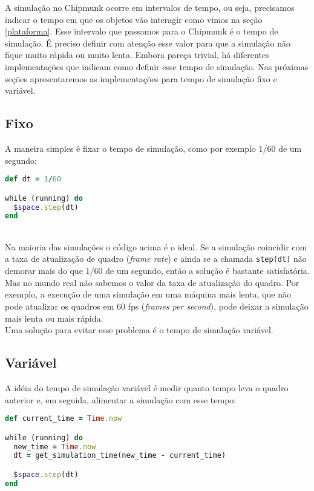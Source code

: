 A simulação no Chipmunk ocorre em intervalos de tempo, ou seja, precisamos indicar o tempo em que os objetos vão interagir como vimos na seção \ref{plataforma}. 
Esse intervalo que passamos para o Chipmunk é o tempo de simulação. É preciso definir com atenção esse valor para que a simulação não fique muito rápida
ou muito lenta. Embora pareça trivial, há diferentes implementações que indicam como definir esse tempo de simulação. Nas 
próximas seções apresentaremos as implementações para tempo de simulação fixo e variável.

\subsection{Fixo}

A maneira simples é fixar o tempo de simulação, como por exemplo 1/60 de um segundo:

\begin{lstlisting}[language=Ruby, caption=Implementação de tempo de simulação fixo]
def dt = 1/60

while (running) do
  $space.step(dt)
end
\end{lstlisting}

\ \\
\hspace*{14pt} Na maioria das simulações o código acima é o ideal. Se a simulação coincidir com a taxa de atualização de quadro (\textit{frame rate}) e ainda se a chamada {\tt step(dt)} não demorar mais do que 1/60 de um segundo, então a solução é bastante satisfatória. Mas no mundo real não sabemos
o valor da taxa de atualização do quadro. Por exemplo, a execução de uma simulação em uma máquina mais lenta, que não pode atualizar os quadros em 60 fps (\textit{frames per second}),
pode deixar a simulação mais lenta ou mais rápida. \\

Uma solução para evitar esse problema é o tempo de simulação variável.

\subsection{Variável}

A idéia do tempo de simulação variável é medir quanto tempo leva o quadro anterior e, em seguida, alimentar a simulação com esse tempo: 

\newpage
\begin{lstlisting}[language=Ruby, caption=Implementação de tempo de simulação variável]
def current_time = Time.now

while (running) do
  new_time = Time.now
  dt = get_simulation_time(new_time - current_time)

  $space.step(dt)
end

\end{lstlisting}

